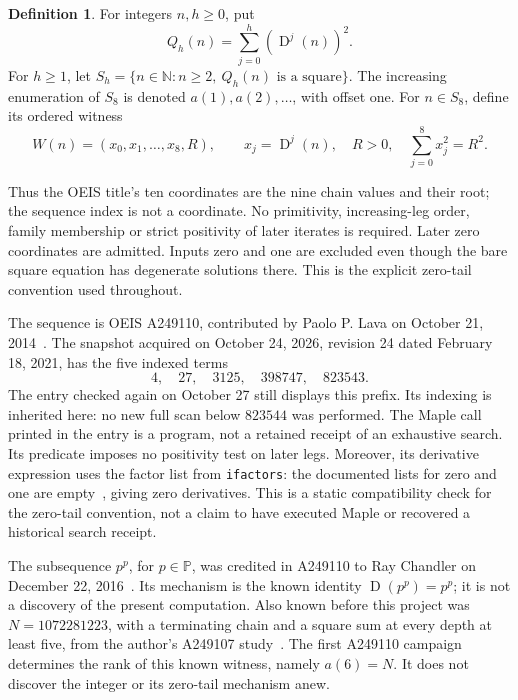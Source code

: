 \documentclass[11pt]{article}
\newcommand{\D}{\operatorname{D}}
\newcommand{\NN}{\mathbb{N}}
\newcommand{\PP}{\mathbb{P}}
\theoremstyle{definition}
\newtheorem{definition}[theorem]{Definition}
\theoremstyle{remark}
\begin{document}
\begin{definition}\label{def:sequence}
For integers $n,h\ge0$, put
\[
 Q_h(n)=\sum_{j=0}^{h}(\D^j(n))^2.
\]
For $h\ge1$, let
$S_h=\{n\in\NN:n\ge2,\ Q_h(n)\text{ is a square}\}$.
The increasing enumeration of $S_8$ is denoted $a(1),a(2),\ldots$,
with offset one. For $n\in S_8$, define its ordered witness
\begin{equation}\label{eq:witness}
 W(n)=(x_0,x_1,\ldots,x_8,R),\qquad
 x_j=\D^j(n),\quad R>0,\quad \sum_{j=0}^8x_j^2=R^2.
\end{equation}
\end{definition}
Thus the OEIS title's ten coordinates are the nine chain values and
their root; the sequence index is not a coordinate. No primitivity, increasing-leg
order, family membership or strict positivity of later iterates is
required. Later zero coordinates are admitted. Inputs zero and one are
excluded even though the bare square equation has degenerate solutions
there. This is the explicit zero-tail convention used throughout.

The sequence is OEIS A249110, contributed by Paolo P. Lava on
October 21, 2014~\cite{sequence}. The snapshot acquired on October 24,
2026, revision 24 dated February 18, 2021, has the five indexed terms
\begin{equation}\label{eq:baseline}
 4,\quad27,\quad3125,\quad398747,\quad823543.
\end{equation}
The entry checked again on October 27 still displays this prefix.
Its indexing is inherited here: no new full scan below $823544$ was
performed. The Maple call printed in the entry is a program, not a
retained receipt of an exhaustive search. Its predicate imposes no
positivity test on later legs. Moreover, its derivative expression uses
the factor list from \texttt{ifactors}: the documented lists for zero
and one are empty~\cite{maple}, giving zero derivatives. This is a
static compatibility check for the zero-tail convention, not a claim
to have executed Maple or recovered a historical search receipt.

The subsequence $p^p$, for $p\in\PP$, was credited in A249110 to
Ray Chandler on December 22, 2016~\cite{sequence,fixedpoints}.
Its mechanism is the known identity $\D(p^p)=p^p$; it is not a
discovery of the present computation. Also known before this project was
$N=1072281223$, with a terminating chain and a square sum at every
depth at least five, from the author's A249107 study~\cite{corti7}.
The first A249110 campaign determines the rank of this known witness,
namely $a(6)=N$. It does not discover the integer or its zero-tail
mechanism anew.
\end{document}
